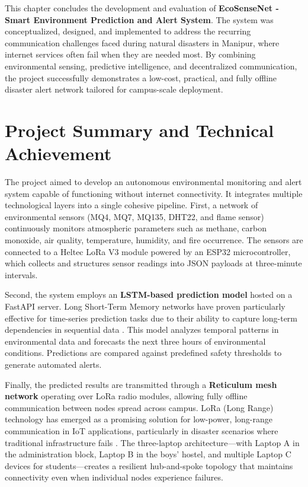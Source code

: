 

This chapter concludes the development and evaluation of \textbf{EcoSenseNet - Smart Environment Prediction and Alert System}. The system was conceptualized, designed, and implemented to address the recurring communication challenges faced during natural disasters in Manipur, where internet services often fail when they are needed most. By combining environmental sensing, predictive intelligence, and decentralized communication, the project successfully demonstrates a low-cost, practical, and fully offline disaster alert network tailored for campus-scale deployment.

\section{Project Summary and Technical Achievement}
The project aimed to develop an autonomous environmental monitoring and alert system capable of functioning without internet connectivity. It integrates multiple technological layers into a single cohesive pipeline. First, a network of environmental sensors (MQ4, MQ7, MQ135, DHT22, and flame sensor) continuously monitors atmospheric parameters such as methane, carbon monoxide, air quality, temperature, humidity, and fire occurrence. The sensors are connected to a Heltec LoRa V3 module powered by an ESP32 microcontroller, which collects and structures sensor readings into JSON payloads at three-minute intervals.

Second, the system employs an \textbf{LSTM-based prediction model} hosted on a FastAPI server. Long Short-Term Memory networks have proven particularly effective for time-series prediction tasks due to their ability to capture long-term dependencies in sequential data \cite{hochreiter1997long}. This model analyzes temporal patterns in environmental data and forecasts the next three hours of environmental conditions. Predictions are compared against predefined safety thresholds to generate automated alerts.

Finally, the predicted results are transmitted through a \textbf{Reticulum mesh network} operating over LoRa radio modules, allowing fully offline communication between nodes spread across campus. LoRa (Long Range) technology has emerged as a promising solution for low-power, long-range communication in IoT applications, particularly in disaster scenarios where traditional infrastructure fails \cite{adelantado2017understanding}. The three-laptop architecture—with Laptop A in the administration block, Laptop B in the boys' hostel, and multiple Laptop C devices for students—creates a resilient hub-and-spoke topology that maintains connectivity even when individual nodes experience failures.

